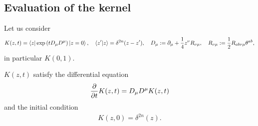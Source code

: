 \documentclass[12pt,a4paper]{article}
\newcommand{\del}{\partial}
\begin{document}
\subsection{Evaluation of the kernel}
Let us consider
\begin{align}
  K(z,t)=\bra{z}\exp\qty(tD_{\mu}D^{\mu})\ket{z=0},\quad
  \ip{z'}{z}=\delta^{2n}(z-z'),\quad
  D_{\mu}:=\del_{\mu}+\frac14 z^{\nu}R_{\nu\mu},\quad
  R_{\nu\mu}:=\frac12 R_{ab\nu\mu}\theta^{ab},
\end{align}
in particular $K(0,1)$.

$K(z,t)$ satisfy the differential equation
\begin{align}
  \pdv{t} K(z,t)=D_{\mu}D^{\mu} K(z,t)
  \label{diffeq}
\end{align}
and the initial condition
\begin{align}
  K(z,0)=\delta^{2n}(z).\label{initial}
\end{align}
\end{document}
